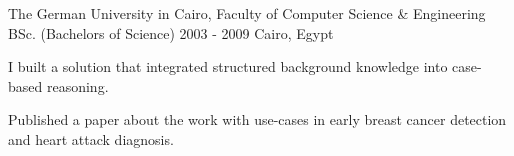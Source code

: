 \begin{cventries}
  \cventry
    {The German University in Cairo, Faculty of Computer Science \& Engineering}  %
    {BSc. (Bachelors of Science)} %
    {2003 - 2009} %
    {Cairo, Egypt} %
    {	
      \begin{cvitems} %
		\item {I built a solution that integrated structured background knowledge into case-based reasoning.}
		\item {Published a paper about the work with use-cases in early breast cancer detection and heart attack diagnosis.}
    \end{cvitems}
    }
    
    
    
    
    



\end{cventries}
